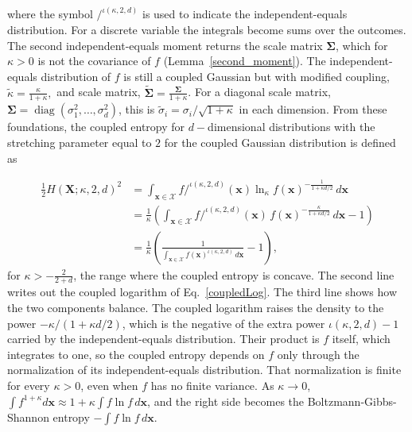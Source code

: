 \documentclass[twoside,11pt]{article}
\begin{document}
where the symbol $/^{\iota(\kappa,2,d)}$ is used to indicate the independent-equals distribution. For a discrete variable the integrals become sums over the outcomes. The second independent-equals moment returns the scale matrix $\boldsymbol{\Sigma}$, which for $\kappa>0$ is not the covariance of $f$ (Lemma~\ref{second_moment}). The independent-equals distribution of $f$ is still a coupled Gaussian but with modified coupling, $\tilde{\kappa}=\frac{\kappa}{1+\kappa},$ and scale matrix, $\widetilde{\boldsymbol{\Sigma}}=\frac{\boldsymbol{\Sigma}}{1+\kappa}$. For a diagonal scale matrix, $\boldsymbol{\Sigma}=\operatorname{diag}(\sigma_1^2,\dots,\sigma_d^2)$, this is $\tilde{\sigma}_i=\sigma_i/\sqrt{1+\kappa}$ in each dimension. From these foundations, the coupled entropy for $d-$dimensional distributions with the stretching parameter equal to $2$ for the coupled Gaussian distribution is defined as \citep{nelsonUniqueUniversalEntropy2026}

\begin{align} \label{CE}
\frac{1}{2}H\left(\mathbf{X};\kappa,2,d\right)^2
&=\int_{\mathbf{x}\in \mathcal{X}}
f/^{\iota(\kappa,2,d)}(\mathbf{x})
\ln_{\kappa}{f(\mathbf{x})^{-\frac{1}{1+\kappa d/2}}}
\,d\mathbf{x} \nonumber \\
&=\frac{1}{\kappa}\left(\int_{\mathbf{x}\in \mathcal{X}}
f/^{\iota(\kappa,2,d)}(\mathbf{x})\,
f(\mathbf{x})^{-\frac{\kappa}{1+\kappa d/2}}
\,d\mathbf{x}-1\right) \nonumber \\
&=\frac{1}{\kappa}\left(\frac{1}{\int_{\mathbf{x}\in \mathcal{X}}f(\mathbf{x})^{\iota(\kappa,2,d)}\,d\mathbf{x}}-1\right),
\end{align}
for $\kappa>-\frac{2}{2+d}$, the range where the coupled entropy is concave. The second line writes out the coupled logarithm of Eq.~\ref{coupledLog}. The third line shows how the two components balance. The coupled logarithm raises the density to the power $-\kappa/(1+\kappa d/2)$, which is the negative of the extra power $\iota(\kappa,2,d)-1$ carried by the independent-equals distribution. Their product is $f$ itself, which integrates to one, so the coupled entropy depends on $f$ only through the normalization of its independent-equals distribution. That normalization is finite for every $\kappa>0$, even when $f$ has no finite variance. As $\kappa\to0$, $\int f^{1+\kappa}d\mathbf{x}\approx 1+\kappa\int f\ln f\,d\mathbf{x}$, and the right side becomes the Boltzmann-Gibbs-Shannon entropy $-\int f\ln f\,d\mathbf{x}$.
\end{document}
